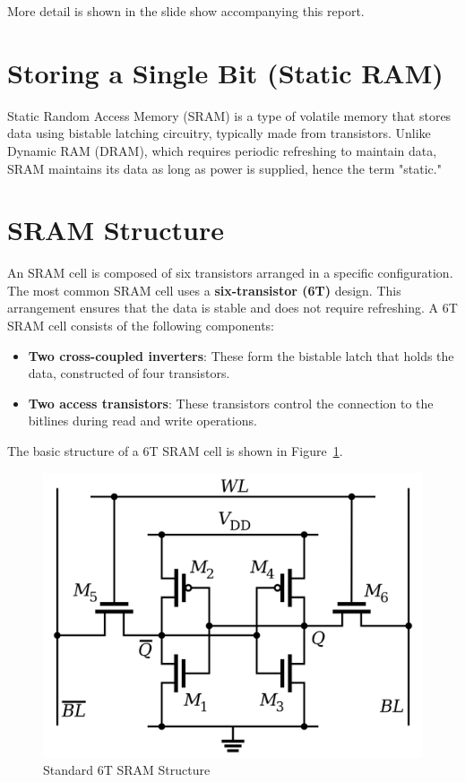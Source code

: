 More detail is shown in the slide show accompanying this report.

\section{Storing a Single Bit (Static RAM)}

Static Random Access Memory (SRAM) is a type of volatile memory that stores data using bistable latching circuitry, typically made from transistors. Unlike Dynamic RAM (DRAM), which requires periodic refreshing to maintain data, SRAM maintains its data as long as power is supplied, hence the term "static."

\section{SRAM Structure}

An SRAM cell is composed of six transistors arranged in a specific configuration. The most common SRAM cell uses a \textbf{six-transistor (6T)} design. This arrangement ensures that the data is stable and does not require refreshing. A 6T SRAM cell consists of the following components:

\begin{itemize}
  \item \textbf{Two cross-coupled inverters}: These form the bistable latch that holds the data, constructed of four transistors.
  \item \textbf{Two access transistors}: These transistors control the connection to the bitlines during read and write operations.
\end{itemize}

The basic structure of a 6T SRAM cell is shown in Figure~\ref{fig:sram}.

\begin{figure}
  \centering
  \includegraphics[scale=0.15]{assets/sram.png}
  \caption{Standard 6T SRAM Structure}
  \label{fig:sram}
\end{figure}

